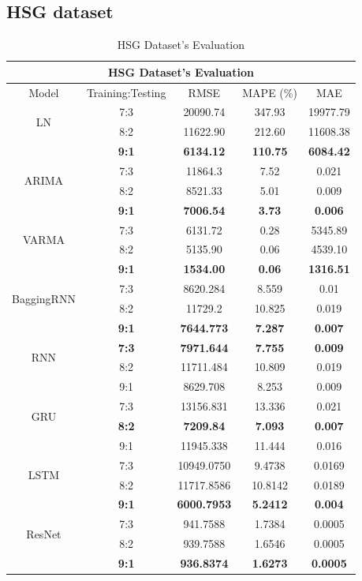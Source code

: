\documentclass{ieeeojies}
\begin{document}
\subsection{HSG dataset} 
\begin{table}[H]
    \centering
    \begin{tabular}{|c|c|c|c|c|}
         \hline
         \multicolumn{5}{|c|}{\textbf{HSG Dataset's Evaluation}}\\
         \hline
         \centering Model & Training:Testing & RMSE & MAPE (\%) & MAE\\
         \hline
         \multirow{2}{*}{LN} & 7:3 & 20090.74 & 347.93 & 19977.79 \\ & 8:2 & 11622.90 & 212.60 & 11608.38 \\ & \textbf{9:1} & \textbf{6134.12} & \textbf{110.75} & \textbf{6084.42}\\
         \hline
         \multirow{2}{*}{ARIMA} & 7:3&11864.3&7.52&0.021\\ & 8:2&8521.33&5.01&0.009 \\ & \textbf{9:1} & \textbf{7006.54} & \textbf{3.73} & \textbf{0.006}\\
         \hline
         \multirow{2}{*}{VARMA} & 7:3	& 6131.72 & 0.28 & 5345.89 \\ & 8:2 & 5135.90 & 0.06 & 4539.10 \\ & \textbf{9:1} & \textbf{1534.00}  & \textbf{0.06} & \textbf{1316.51}\\
         \hline
         \multirow{2}{*}{BaggingRNN} & 7:3 &  8620.284 &  8.559 & 0.01 \\ & 8:2 &  11729.2 & 10.825 & 0.019 \\ & \textbf{9:1} & \textbf{7644.773}  & \textbf{7.287} & \textbf{0.007}\\
         \hline
         \multirow{2}{*}{RNN} & \textbf{7:3}	& \textbf{7971.644} & \textbf{7.755} & \textbf{0.009} \\ & 8:2 & 11711.484 & 10.809 & 0.019 \\ & 9:1 & 8629.708 & 8.253 & 0.009\\
         \hline
         \multirow{2}{*}{GRU} & 7:3 & 13156.831&13.336 & 0.021 \\ & \textbf{8:2} &	\textbf{7209.84} & \textbf{7.093} & \textbf{0.007} \\ & 9:1 &11945.338	&11.444&0.016\\
         \hline
         \multirow{2}{*}{LSTM} & 7:3 & 10949.0750 & 9.4738 & 0.0169 \\ & 8:2 & 11717.8586 &10.8142 & 0.0189 \\ & \textbf{9:1} &  	\textbf{6000.7953} &	\textbf{5.2412} & 	\textbf{0.004} \\
         \hline
         \multirow{2}{*}{ResNet} & 7:3 & 941.7588 &  1.7384 &  0.0005 \\ & 8:2 & 939.7588 &  1.6546 &  0.0005 \\ & \textbf{9:1} & \textbf{936.8374} & \textbf{1.6273} & \textbf{0.0005}\\
         \hline
    \end{tabular}
    \caption{HSG Dataset's Evaluation}
    \label{mbbresult}
\end{table}
\end{document}
